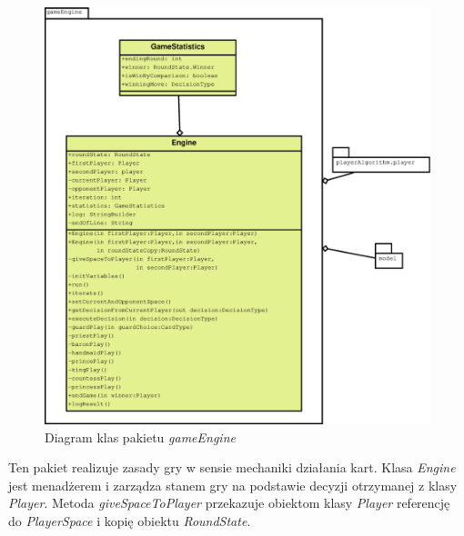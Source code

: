 \begin{figure}[H]
	\centering
	\includegraphics[width=\textwidth]{Resources/diagramKlas_engine.eps}
	\caption{Diagram klas pakietu \textit{gameEngine}} 
	\label{fig:llMainImage}
\end{figure}
Ten pakiet realizuje zasady gry w sensie mechaniki działania kart. Klasa \textit{Engine} jest menadżerem i zarządza stanem gry na podstawie decyzji otrzymanej z klasy \textit{Player}. Metoda \textit{giveSpaceToPlayer} przekazuje obiektom klasy \textit{Player} referencję do \textit{PlayerSpace} i kopię obiektu \textit{RoundState}. 


